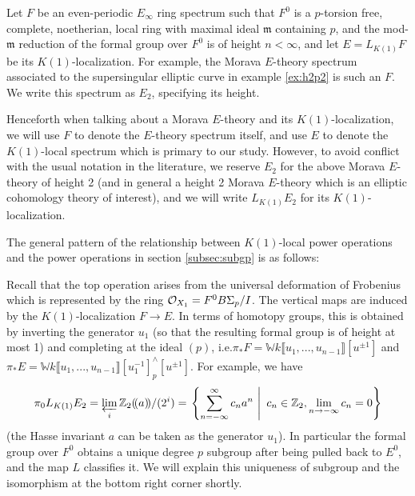 \documentclass{gtpart}
\theoremstyle{definition}
\theoremstyle{remark}
\newcommand{\mb}[1]{\mathbb{#1}}
\newcommand{\mf}[1]{\mathfrak{#1}}
\newcommand{\CO}{{\cal O}}
\begin{document}
Let $F$ be an even-periodic $E_\infty$ ring spectrum such that $F^0$ is a 
$p$-torsion free, complete, noetherian, local ring with maximal ideal $\mf m$ 
containing $p$, and the mod-$\mf m$ reduction of the formal group over $F^0$ 
is of height $n < \infty$, and let $E = L_{K(1)} F$ be its 
$K(1)$-localization.  For example, the Morava $E$-theory spectrum associated 
to the supersingular elliptic curve in example \ref{ex:h2p2} is such an $F$.  
We write this spectrum as $E_2$, specifying its height.  

Henceforth when talking about a Morava $E$-theory and its $K(1)$-localization, 
we will use $F$ to denote the $E$-theory spectrum itself, and use $E$ to 
denote the $K(1)$-local spectrum which is primary to our study.  However, to 
avoid conflict with the usual notation in the literature, we reserve $E_2$ for 
the above Morava $E$-theory of height 2 (and in general a height 2 Morava 
$E$-theory which is an elliptic cohomology theory of interest), and we will 
write $L_{K(1)} E_2$ for its $K(1)$-localization.  

The general pattern of the relationship between $K(1)$-local power operations 
and the power operations in section \ref{subsec:subgp} is as follows: 
\begin{center}
\end{center}
Recall that the top operation arises from the universal deformation of 
Frobenius which is represented by the ring $\CO_{X_1} = F^0 B\Sigma_p/I$.  The 
vertical maps are induced by the $K(1)$-localization $F \to E$.  In terms of 
homotopy groups, this is obtained by inverting the generator $u_1$ (so that 
the resulting formal group is of height at most 1) and completing at the ideal 
$(p)$, i.e.\thinspace$\pi_* F = {\mb W}k \llbracket u_1,...,u_{n-1} \rrbracket 
[u^{\pm1}]$ and $\pi_* E = 
{\mb W}k \llbracket u_1,...,u_{n-1} \rrbracket [u_1^{-1}]_p^\wedge 
[u^{\pm1}]$.  For example, we have 
\[
 \pi_0 L_{K(1)} E_2 = \varprojlim_i {\mb Z_2} (\!(a)\!) /(2^i) = 
 \left.\left\{\sum_{n = -\infty}^{\infty} c_n a^n~\right|~c_n \in {\mb Z}_2, 
 \lim_{n \to -\infty} c_n = 0\right\} 
\]
(the Hasse invariant $a$ can be taken as the generator $u_1$).  In particular 
the formal group over $F^0$ obtains a unique degree $p$ subgroup after being 
pulled back to $E^0$, and the map $L$ classifies it.  We will explain this 
uniqueness of subgroup and the isomorphism at the bottom right corner shortly.  
\end{document}

